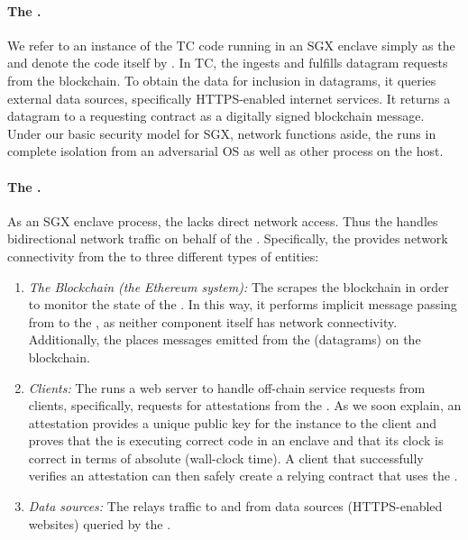\paragraph{The \encname.}
We refer to an instance of the TC code running in an SGX enclave simply as the \encname and denote the code itself by  \engine. In TC, the \encname ingests and fulfills datagram requests from the blockchain. To obtain the data for inclusion in datagrams, it queries external data sources, specifically HTTPS-enabled internet services. It returns a datagram to a requesting contract \reqcont as a digitally signed blockchain message. Under our basic security model for SGX, network functions aside, the \encname runs in complete isolation from an adversarial OS as well as other process on the host. 

\paragraph{The \medname \relay.} As an SGX enclave process, the \encname lacks direct network access. Thus the \medname handles bidirectional network traffic on behalf of the \encname. Specifically, the \medname provides network connectivity from the \encname to three different types of entities: 

\begin{enumerate}
\item {\em The Blockchain (the Ethereum system):}  The \medname scrapes the blockchain in order to monitor the state of the \tcontract  \tcont. In this way, it performs implicit message passing from \tcont to the \encname, as neither component itself has network connectivity. Additionally, the \medname places messages emitted from the \encname (datagrams) on the blockchain.
\item {\em Clients:} The \medname runs a web server to handle off-chain service requests from clients, specifically, requests for attestations from the \encname. As we soon explain, an attestation provides a unique public key for the \encname instance to the  client and proves that the \encname is executing correct code in an enclave and that its clock is correct in terms of absolute (wall-clock time). A client that successfully verifies an attestation can then safely create a relying contract \reqcont that uses the \tc.
\item {\em Data sources:} The \medname relays traffic to and from data sources (HTTPS-enabled websites) queried by the \encname. 
\end{enumerate}

